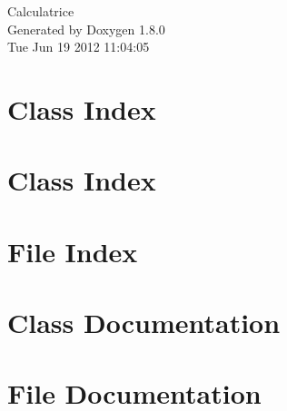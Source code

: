 \documentclass{book}
\begin{document}
\hypersetup{pageanchor=false,citecolor=blue}
\begin{titlepage}
\vspace*{7cm}
\begin{center}
{\Large Calculatrice }\\
\vspace*{1cm}
{\large Generated by Doxygen 1.8.0}\\
\vspace*{0.5cm}
{\small Tue Jun 19 2012 11:04:05}\\
\end{center}
\end{titlepage}
\clearemptydoublepage
{}
\tableofcontents
\clearemptydoublepage
{}
\hypersetup{pageanchor=true,citecolor=blue}
\chapter{Class Index}

\chapter{Class Index}

\chapter{File Index}

\chapter{Class Documentation}


















\chapter{File Documentation}









\printindex
\end{document}
